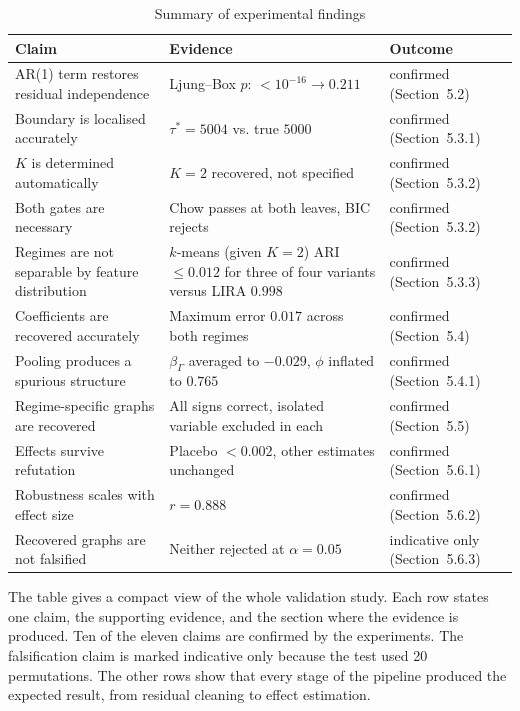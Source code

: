 \begin{table}[htbp]
    \centering
    \small
    \caption{Summary of experimental findings}
    \label{tab:ch5-summary}
    \begin{tabularx}{\textwidth}{|>{\raggedright\arraybackslash}p{3.4cm}|>{\raggedright\arraybackslash}X|>{\raggedright\arraybackslash}p{2.5cm}|}
        \hline
        Claim & Evidence & Outcome \\ \hline
        AR(1) term restores residual independence & Ljung--Box $p$: $<10^{-16} \to 0.211$ & confirmed (Section~5.2) \\ \hline
        Boundary is localised accurately & $\tau^* = 5004$ vs. true $5000$ & confirmed (Section~5.3.1) \\ \hline
        $K$ is determined automatically & $K = 2$ recovered, not specified & confirmed (Section~5.3.2) \\ \hline
        Both gates are necessary & Chow passes at both leaves, BIC rejects & confirmed (Section~5.3.2) \\ \hline
        Regimes are not separable by feature distribution & $k$-means (given $K=2$) ARI $\leq 0.012$ for three of four variants versus LIRA $0.998$ & confirmed (Section~5.3.3) \\ \hline
        Coefficients are recovered accurately & Maximum error $0.017$ across both regimes & confirmed (Section~5.4) \\ \hline
        Pooling produces a spurious structure & $\beta_\Gamma$ averaged to $-0.029$, $\phi$ inflated to $0.765$ & confirmed (Section~5.4.1) \\ \hline
        Regime-specific graphs are recovered & All signs correct, isolated variable excluded in each & confirmed (Section~5.5) \\ \hline
        Effects survive refutation & Placebo $<0.002$, other estimates unchanged & confirmed (Section~5.6.1) \\ \hline
        Robustness scales with effect size & $r = 0.888$ & confirmed (Section~5.6.2) \\ \hline
        Recovered graphs are not falsified & Neither rejected at $\alpha=0.05$ & indicative only (Section~5.6.3) \\ \hline
    \end{tabularx}
\end{table}

The table gives a compact view of the whole validation study. Each row states one
claim, the supporting evidence, and the section where the evidence is produced. Ten
of the eleven claims are confirmed by the experiments. The falsification claim is
marked indicative only because the test used 20 permutations. The other rows show
that every stage of the pipeline produced the expected result, from residual
cleaning to effect estimation.
